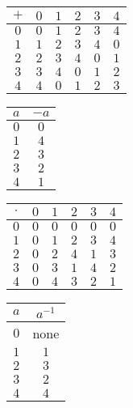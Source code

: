 \begin{tabular}{|c|ccccc|}\hline
  $+$ & $0$ & $1$ & $2$ & $3$ & $4$ \\ \hline
  $0$ & $0$ & $1$ & $2$ & $3$ & $4$ \\
  $1$ & $1$ & $2$ & $3$ & $4$ & $0$ \\
  $2$ & $2$ & $3$ & $4$ & $0$ & $1$ \\
  $3$ & $3$ & $4$ & $0$ & $1$ & $2$ \\
  $4$ & $4$ & $0$ & $1$ & $2$ & $3$ \\ \hline
\end{tabular}
\hfill
\begin{tabular}{|c|c|}\hline
  $a$ & $-a$ \\ \hline
  $0$ & $0$ \\
  $1$ & $4$ \\
  $2$ & $3$ \\
  $3$ & $2$ \\
  $4$ & $1$ \\ \hline
\end{tabular}
\hfill
\begin{tabular}{|c|ccccc|}\hline
  $\cdot$ & $0$ & $1$ & $2$ & $3$ & $4$ \\ \hline
  $0$ & $0$ & $0$ & $0$ & $0$ & $0$ \\
  $1$ & $0$ & $1$ & $2$ & $3$ & $4$ \\
  $2$ & $0$ & $2$ & $4$ & $1$ & $3$ \\
  $3$ & $0$ & $3$ & $1$ & $4$ & $2$ \\
  $4$ & $0$ & $4$ & $3$ & $2$ & $1$ \\ \hline
\end{tabular}
\hfill
\begin{tabular}{|c|c|}\hline
  $a$ & $a^{-1}$ \\ \hline
  $0$ & none \\
  $1$ & $1$ \\
  $2$ & $3$ \\
  $3$ & $2$ \\
  $4$ & $4$ \\ \hline
\end{tabular}

